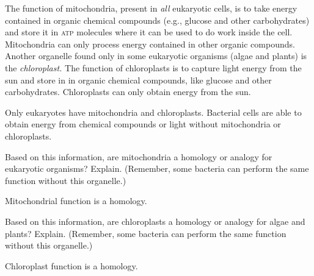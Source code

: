 \documentclass[12pt, hidelinks]{exam}
\newcommand*\AnswerBox[2]{%
    \parbox[t][#1]{0.92\textwidth}{%
    \begin{solution}#2\end{solution}}
    \vspace{\stretch{1}}
}
\begin{document}
\begin{questions}
The function of mitochondria, present in \emph{all} eukaryotic cells, is to take energy 
contained in organic chemical compounds (e.g., glucose  and other carbohydrates) 
and store it in \textsc{atp} molecules where it can be used to do work inside the cell.
Mitochondria can only process energy contained in other organic compounds.
Another organelle found only in some eukaryotic organisms (algae and plants)
is the \emph{chloroplast.} The function of chloroplasts is to capture light energy from the sun and
store in in organic chemical compounds, like glucose and other carbohydrates. Chloroplasts
can only obtain energy from the sun. 

Only eukaryotes have mitochondria and chloroplasts. Bacterial cells are able to obtain energy
from chemical compounds or light without mitochondria or chloroplasts.

\question
Based on this information, are mitochondria a homology or analogy for eukaryotic
organisms? Explain. (Remember, some bacteria can perform the same function without this
organelle.)

\AnswerBox{4\baselineskip}{Mitochondrial function is a homology.}

\question
Based on this information, are chloroplasts a homology or analogy for algae and plants?
 Explain. (Remember, some bacteria can perform the same function without this
organelle.)

\AnswerBox{4\baselineskip}{Chloroplast function is a homology.}



\end{questions}
\end{document}
